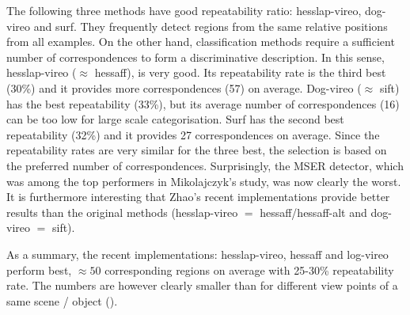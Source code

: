 \documentclass[preprint,authoryear,review]{elsarticle}
\newcommand{\commentNK}[1]{{\bf NK: #1}}
\begin{document}
The following three methods have good repeatability ratio: hesslap-vireo,
dog-vireo and surf. 
They frequently detect regions from the same relative positions from
all examples. On the other hand, classification methods require a sufficient number of
correspondences to form a discriminative description. In this sense,
hesslap-vireo ($\approx$ hessaff), is very good. Its repeatability rate is
the third best (30\%) and it provides more correspondences (57) on average. Dog-vireo
($\approx$ sift) has the best repeatability (33\%), but its average number of correspondences (16) can
be too low for large scale categorisation. Surf has the second best repeatability (32\%) and
it provides 27 correspondences on average. Since the repeatability rates are very similar for the three
best, the selection is based on the preferred number of correspondences.
Surprisingly, the MSER detector, which was among the top performers in Mikolajczyk's study, was now clearly the worst.%
It is furthermore interesting that Zhao's recent implementations 
provide better results than the original methods (hesslap-vireo $=$ hessaff/hessaff-alt
and dog-vireo $=$ sift).

As a summary, the recent implementations: hesslap-vireo, hessaff
and log-vireo perform best, $\approx50$ corresponding regions on average with
25-30\% repeatability rate. The numbers are however clearly smaller than for
different view points of a same scene / object (\cite{MikTuySch:2005}).%


%
\end{document}
